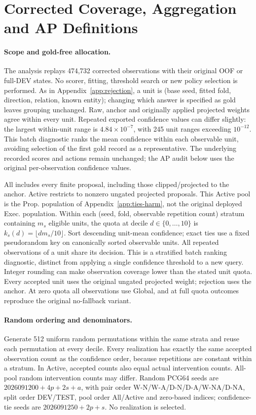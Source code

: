 \documentclass[11pt,a4paper]{article}
\begin{document}
\section{Corrected Coverage, Aggregation and AP Definitions}
\label{app:coverage-quality}

\paragraph{Scope and gold-free allocation.}
The  analysis replays 474,732 corrected observations with their original OOF or full-DEV states. No scorer, fitting, threshold search or new policy selection is performed. As in Appendix~\ref{app:rejection}, a unit is (base seed, fitted fold, direction, relation, known entity); changing which answer is specified as gold leaves grouping unchanged. Raw, anchor and originally applied projected weights agree within every unit. Repeated exported confidence values can differ slightly: the largest within-unit range is $4.84\times10^{-7}$, with 245 unit ranges exceeding $10^{-12}$. This batch diagnostic ranks the mean confidence within each observable unit, avoiding selection of the first gold record as a representative. The underlying recorded scores and actions remain unchanged; the AP audit below uses the original per-observation confidence values.

All includes every finite proposal, including those clipped/projected to the anchor. Active restricts to nonzero ungated projected proposals. This Active pool is the Prop. population of Appendix~\ref{app:ties-harm}, not the original deployed Exec. population. Within each (seed, fold, observable repetition count) stratum containing $m_s$ eligible units, the quota at decile $d\in\{0,\ldots,10\}$ is $k_s(d)=\lfloor d m_s/10\rfloor$. Sort descending unit-mean confidence; exact ties use a fixed pseudorandom key on canonically sorted observable units. All repeated observations of a unit share its decision. This is a stratified batch ranking diagnostic, distinct from applying a single confidence threshold to a new query. Integer rounding can make observation coverage lower than the stated unit quota. Every accepted unit uses the original ungated projected weight; rejection uses the anchor. At zero quota all observations use Global, and at full quota outcomes reproduce the original no-fallback variant.

\paragraph{Random ordering and denominators.}
Generate 512 uniform random permutations within the same strata and reuse each permutation at every decile. Every realization has exactly the same accepted observation count as the confidence order, because repetitions are constant within a stratum. In Active, accepted counts also equal actual intervention counts. All-pool random intervention counts may differ. Random PCG64 seeds are $2026091200+4p+2s+a$, with pair order W-N/W-A/D-N/D-A/W-NA/D-NA, split order DEV/TEST, pool order All/Active and zero-based indices; confidence-tie seeds are $2026091250+2p+s$. No realization is selected.
\end{document}

